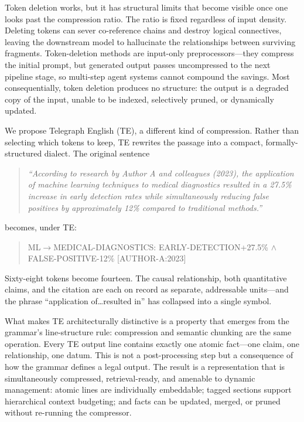 \documentclass{article}
\newcommand{\teArrow}{\ensuremath{\rightarrow}}
\newcommand{\teAnd}{\ensuremath{\wedge}}
\begin{document}
Token deletion works, but it has structural limits that become visible once one looks past the compression ratio. The ratio is fixed regardless of input density. Deleting tokens can sever co-reference chains and destroy logical connectives, leaving the downstream model to hallucinate the relationships between surviving fragments. Token-deletion methods are input-only preprocessors---they compress the initial prompt, but generated output passes uncompressed to the next pipeline stage, so multi-step agent systems cannot compound the savings. Most consequentially, token deletion produces no structure: the output is a degraded copy of the input, unable to be indexed, selectively pruned, or dynamically updated.

We propose Telegraph English (TE), a different kind of compression. Rather than selecting which tokens to keep, TE rewrites the passage into a compact, formally-structured dialect. The original sentence
\begin{quote}\small
\emph{``According to research by Author A and colleagues (2023), the application of machine learning techniques to medical diagnostics resulted in a 27.5\% increase in early detection rates while simultaneously reducing false positives by approximately 12\% compared to traditional methods.''}
\end{quote}
becomes, under TE:
\begin{quote}\footnotesize\ttfamily
ML\teArrow{}MEDICAL-DIAGNOSTICS: EARLY-DETECTION+27.5\% \teAnd{} FALSE-POSITIVE-12\% [AUTHOR-A:2023]
\end{quote}
Sixty-eight tokens become fourteen. The causal relationship, both quantitative claims, and the citation are each on record as separate, addressable units---and the phrase ``application of\dots resulted in'' has collapsed into a single symbol.

What makes TE architecturally distinctive is a property that emerges from the grammar's line-structure rule: compression and semantic chunking are the same operation. Every TE output line contains exactly one atomic fact---one claim, one relationship, one datum. This is not a post-processing step but a consequence of how the grammar defines a legal output. The result is a representation that is simultaneously compressed, retrieval-ready, and amenable to dynamic management: atomic lines are individually embeddable; tagged sections support hierarchical context budgeting; and facts can be updated, merged, or pruned without re-running the compressor.
\end{document}
